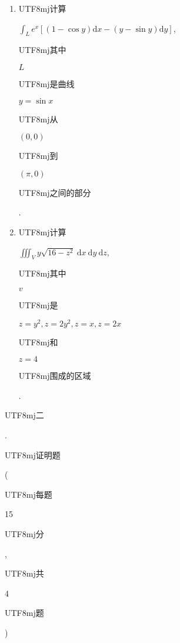 \documentclass[10pt]{article}
\begin{document}
\begin{enumerate}
  \item \begin{CJK}{UTF8}{mj}计算\end{CJK} $\int_{L} e^{x}[(1-\cos y) \mathrm{d} x-(y-\sin y) \mathrm{d} y]$, \begin{CJK}{UTF8}{mj}其中\end{CJK} $L$ \begin{CJK}{UTF8}{mj}是曲线\end{CJK} $y=\sin x$ \begin{CJK}{UTF8}{mj}从\end{CJK} $(0,0)$ \begin{CJK}{UTF8}{mj}到\end{CJK} $(\pi, 0)$ \begin{CJK}{UTF8}{mj}之间的部分\end{CJK}.

  \item \begin{CJK}{UTF8}{mj}计算\end{CJK} $\iiint_{V} y \sqrt{16-z^{2}} \mathrm{~d} x \mathrm{~d} y \mathrm{~d} z$, \begin{CJK}{UTF8}{mj}其中\end{CJK} $v$ \begin{CJK}{UTF8}{mj}是\end{CJK} $z=y^{2}, z=2 y^{2}, z=x, z=2 x$ \begin{CJK}{UTF8}{mj}和\end{CJK} $z=4$ \begin{CJK}{UTF8}{mj}围成的区域\end{CJK}.

\end{enumerate}
\begin{CJK}{UTF8}{mj}二\end{CJK}. \begin{CJK}{UTF8}{mj}证明题\end{CJK}(\begin{CJK}{UTF8}{mj}每题\end{CJK} 15 \begin{CJK}{UTF8}{mj}分\end{CJK}, \begin{CJK}{UTF8}{mj}共\end{CJK} 4 \begin{CJK}{UTF8}{mj}题\end{CJK})
\end{document}

